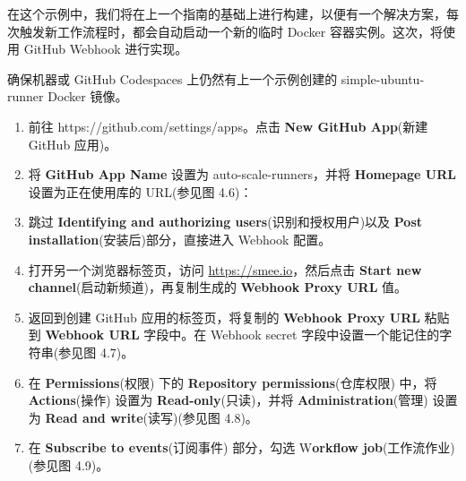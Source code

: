 在这个示例中，我们将在上一个指南的基础上进行构建，以便有一个解决方案，每次触发新工作流程时，都会自动启动一个新的临时 Docker 容器实例。这次，将使用 GitHub Webhook 进行实现。


确保机器或 GitHub Codespaces 上仍然有上一个示例创建的 simple-ubuntu-runner Docker 镜像。


\begin{enumerate}
\item 
前往 https://github.com/settings/apps。点击 \textbf{New GitHub App}(新建 GitHub 应用)。

\item 
将 \textbf{GitHub App Name} 设置为 auto-scale-runners，并将 \textbf{Homepage URL} 设置为正在使用库的 URL(参见图 4.6)：


\item 
跳过 \textbf{Identifying and authorizing users}(识别和授权用户)以及 \textbf{Post installation}(安装后)部分，直接进入 Webhook 配置。

\item 
打开另一个浏览器标签页，访问 \url{https://smee.io}，然后点击 \textbf{Start new channel}(启动新频道)，再复制生成的 \textbf{Webhook Proxy URL} 值。

\item 
返回到创建 GitHub 应用的标签页，将复制的 \textbf{Webhook Proxy URL} 粘贴到 \textbf{Webhook URL} 字段中。在 Webhook secret 字段中设置一个能记住的字符串(参见图 4.7)。


\item 
在 \textbf{Permissions}(权限) 下的 \textbf{Repository permissions}(仓库权限) 中，将 \textbf{Actions}(操作) 设置为 \textbf{Read-only}(只读)，并将 \textbf{Administration}(管理) 设置为 \textbf{Read and write}(读写)(参见图 4.8)。


\item 
在 \textbf{Subscribe to events}(订阅事件) 部分，勾选 W\textbf{orkflow job}(工作流作业)(参见图 4.9)。



\end{enumerate}
